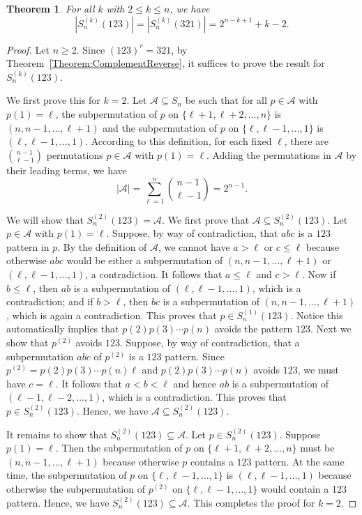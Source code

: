 \documentclass[11pt]{article}
\newtheorem{theorem}{Theorem}[section]
\theoremstyle{definition}
\numberwithin{equation}{section}
\begin{document}
\begin{theorem}\label{Theorem:MonotonePatterns}
    For all $k$ with $2\leq k\leq n$, we have 
    \[
    |S_n^{(k)}(123)|=|S_n^{(k)}(321)|=2^{n-k+1}+k-2.
    \]
\end{theorem}
\begin{proof}
Let $n\geq2$. Since $(123)^r=321$, by Theorem~\ref{Theorem:ComplementReverse}, it suffices to prove the result for $S_n^{(k)}(123)$.

We first prove this for $k=2$. Let $\mathcal{A}\subseteq S_n$ be such that for all $p\in\mathcal{A}$ with $p(1)=\ell$, the subpermutation of $p$ on $\{\ell+1,\ell+2,\ldots,n\}$ is $(n,n-1,\ldots,\ell+1)$ and the subpermutation of $p$ on $\{\ell,\ell-1,\ldots,1\}$ is $(\ell,\ell-1,\ldots,1)$. 
According to this 
definition, for each fixed $\ell$, there are $\binom{n-1}{\ell-1}$ permutations $p\in\mathcal{A}$ with $p(1)=\ell$. Adding the permutations in $\mathcal{A}$ by their leading terms, we have 
\[
|\mathcal{A}|=\sum_{\ell=1}^n\binom{n-1}{\ell-1}=2^{n-1}.
\]

We will show that $S_n^{(2)}(123)=\mathcal{A}$. We first prove that $\mathcal{A}\subseteq S_n^{(2)}(123)$. Let $p\in\mathcal{A}$ with $p(1)=\ell$. 
Suppose, by way of contradiction, that $abc$ is a $123$ pattern in $p$. By the definition of $\mathcal{A}$, we cannot have $a>\ell$ or $c\leq\ell$ because otherwise $abc$ would be either a subpermutation of $(n,n-1,\ldots,\ell+1)$ or $(\ell,\ell-1,\ldots,1)$, 
a contradiction. It follows that $a\leq\ell$ and $c>\ell$. Now if $b\leq \ell$, then $ab$ is a subpermutation of $(\ell,\ell-1,\ldots,1)$, which is a contradiction; and if $b>\ell$, then $bc$ is a subpermutation of $(n,n-1,\ldots,\ell+1)$, which is again a contradiction. This proves that $p\in S_n^{(1)}(123)$. 
Notice this automatically implies that $p(2)p(3)\cdots p(n)$ avoids the pattern $123$. Next we show that $p^{(2)}$ avoids $123$. 
Suppose, by way of contradiction, that a subpermutation $abc$ of $p^{(2)}$ is a $123$ pattern. 
Since $p^{(2)}=p(2)p(3)\cdots p(n)\ell$ and $p(2)p(3)\cdots p(n)$ avoids $123$, we must have $c=\ell$. It follows that $a<b<\ell$ and hence $ab$ is a subpermutation of $(\ell-1,\ell-2,\ldots,1)$, which is a contradiction. This proves that $p \in S_n^{(2)}(123)$. Hence, we have $\mathcal{A}\subseteq S_n^{(2)}(123)$.

It remains to show that $S_n^{(2)}(123)\subseteq\mathcal{A}$. Let $p\in S_n^{(2)}(123)$. Suppose $p(1)=\ell$. Then the subpermutation of $p$ on $\{\ell+1,\ell+2,\ldots,n\}$ must be $(n,n-1,\ldots,\ell+1)$ because otherwise $p$ contains a $123$ pattern. At the same time, the subpermutation of $p$ on $\{\ell,\ell-1,\ldots,1\}$ is $(\ell,\ell-1,\ldots,1)$ because otherwise the subpermutation of $p^{(2)}$ on $\{\ell,\ell-1,\ldots,1\}$ would contain a 123 pattern. Hence, we have $S_n^{(2)}(123)\subseteq\mathcal{A}$. This completes the proof for $k=2$.


\end{proof}
\end{document}
